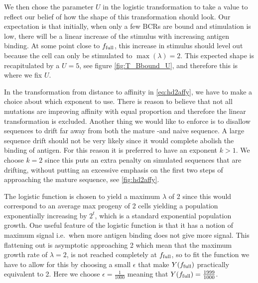 We then chose the parameter $U$ in the logistic transformation to take a value to reflect our belief of how the shape of this transformation should look.
Our expectation is that initially, when only a few BCRs are bound and stimulation is low, there will be a linear increase of the stimulus with increasing antigen binding.
At some point close to $f_{\text{full}}$, this increase in stimulus should level out because the cell can only be stimulated to $\operatorname{max}(\lambda)=2$.
This expected shape is recapitulated by a $U=5$, see figure \ref{fig:T_Bbound_U}, and therefore this is where we fix $U$.

In the transformation from distance to affinity in \eqref{eq:hd2affy}, we have to make a choice about which exponent to use.
There is reason to believe that not all mutations are improving affinity with equal proportion and therefore the linear transformation is excluded.
Another thing we would like to enforce is to disallow sequences to drift far away from both the mature -and naive sequence.
A large sequence drift should not be very likely since it would complete abolish the binding of antigen.
For this reason it is preferred to have an exponent $k>1$.
We choose $k=2$ since this puts an extra penalty on simulated sequences that are drifting, without putting an excessive emphasis on the first two steps of approaching the mature sequence, see \ref{fig:hd2affy}.

The logistic function is chosen to yield a maximum $\lambda$ of 2 since this would correspond to an average max progeny of 2 cells yielding a population exponentially increasing by $2^t$, which is a standard exponential population growth.
One useful feature of the logistic function is that it has a notion of maximum signal i.e.\ when more antigen binding does not give more signal.
This flattening out is asymptotic approaching 2 which mean that the maximum growth rate of $\lambda=2$, is not reached completely at $f_{\text{full}}$, so to fit the function we have to allow for this by choosing a small $\epsilon$ that make $Y(f_{\text{full}})$ practically equivalent to 2.
Here we choose $\epsilon=\frac{1}{1000}$ meaning that $Y(f_{\text{full}}) = \frac{1999}{1000}$.

